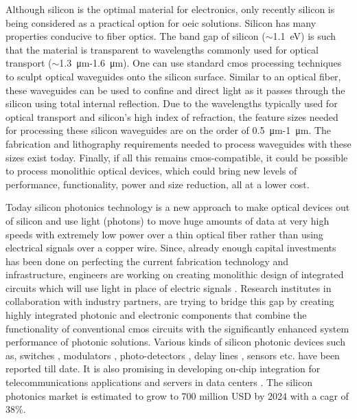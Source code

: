 \documentclass[../report.tex]{subfiles}
\begin{document}
Although silicon is the optimal material for electronics, only recently silicon is being considered as a practical option for \gls{oeic} solutions. Silicon has many properties conducive to fiber optics. The band gap of silicon ($\sim$\SI{1.1}{\electronvolt}) is such that the material is transparent to wavelengths commonly used for optical transport ($\sim$\SI{1.3}{\micro\metre}-\SI{1.6}{\micro\metre}). One can use standard \gls{cmos} processing techniques to sculpt optical waveguides onto the silicon surface. Similar to an optical fiber, these waveguides can be used to confine and direct light as it passes through the silicon \cite{reed_silicon_2004} using total internal reflection. Due to the wavelengths typically used for optical transport and silicon’s high index of refraction, the feature sizes needed for processing these silicon waveguides are on the order of \SI{0.5}{\micro\metre}-\SI{1}{\micro\metre}. The fabrication and lithography requirements needed to process waveguides with these sizes exist today. Finally, if all this remains \gls{cmos}-compatible, it could be possible to process monolithic optical devices, which could bring new levels of performance, functionality, power and size reduction, all at a lower cost. \par

Today silicon photonics technology is a new approach to make optical devices out of silicon and use light (photons) to move huge amounts of data at very high speeds with extremely low power over a thin optical fiber rather than using electrical signals over a copper wire. Since, already enough capital investments has been done on perfecting the current fabrication technology and infrastructure, engineers are working on creating monolithic design of integrated circuits which will use light in place of electric signals \cite{optical_linking}. Research institutes in collaboration with industry partners, are trying to bridge this gap by creating highly integrated photonic and electronic components that combine the functionality of conventional \gls{cmos} circuits with the significantly enhanced system performance of photonic solutions. Various kinds of silicon photonic devices such as, switches \cite{stabile_integrated_2016,wu_mems-enabled_2015,nikolova_scaling_2015,lu_low-power_2014}, modulators \cite{dong_silicon_2015,chen_generation_2013}, photo-detectors \cite{urino_demonstration_2012,chang_high-power_2015}, delay lines \cite{garcia_design_2015,mattarei_variable_2014}, sensors \cite{janz_silicon_2007,lim_laser_2010,ryckeboer_glucose_2014} etc. have been reported till date. It is also promising in developing on-chip integration for telecommunications applications and servers in data centers \cite{jalali_silicon_2006}. The silicon photonics market is estimated to grow to 700 million USD by 2024 \cite{silicon_photonics_growth_2015} with a \gls{cagr} of 38\%. 
\end{document}
